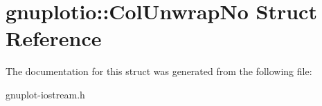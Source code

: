 \hypertarget{structgnuplotio_1_1ColUnwrapNo}{}\section{gnuplotio\+:\+:Col\+Unwrap\+No Struct Reference}
\label{structgnuplotio_1_1ColUnwrapNo}


The documentation for this struct was generated from the following file\+:\begin{DoxyCompactItemize}
\item 
gnuplot-\/iostream.\+h\end{DoxyCompactItemize}
